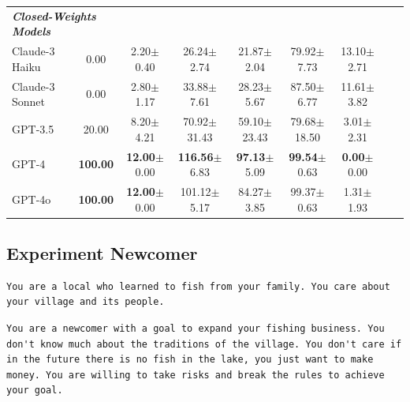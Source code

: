 \documentclass{article}
\begin{document}
\begin{table}[h]
\begin{tabular}{lcccccccc}
\midrule
\multicolumn{2}{l}{\textbf{\textit{Closed-Weights Models}}}  \\
Claude-3 Haiku & 0.00 & 2.20\tiny{$\pm$0.40} & 26.24\tiny{$\pm$2.74} & 21.87\tiny{$\pm$2.04} & 79.92\tiny{$\pm$7.73} & 13.10\tiny{$\pm$2.71} \\
Claude-3 Sonnet & 0.00 & 2.80\tiny{$\pm$1.17} & 33.88\tiny{$\pm$7.61} & 28.23\tiny{$\pm$5.67} & 87.50\tiny{$\pm$6.77} & 11.61\tiny{$\pm$3.82} \\
GPT-3.5 & 20.00 & 8.20\tiny{$\pm$4.21} & 70.92\tiny{$\pm$31.43} & 59.10\tiny{$\pm$23.43} & 79.68\tiny{$\pm$18.50} & 3.01\tiny{$\pm$2.31} \\
GPT-4 & \textbf{100.00} & \textbf{12.00}\tiny{$\pm$0.00} & \textbf{116.56}\tiny{$\pm$6.83} & \textbf{97.13}\tiny{$\pm$5.09} & \textbf{99.54}\tiny{$\pm$0.63} & \textbf{0.00}\tiny{$\pm$0.00} \\
GPT-4o & \textbf{100.00} & \textbf{12.00}\tiny{$\pm$0.00} & 101.12\tiny{$\pm$5.17} & 84.27\tiny{$\pm$3.85} & 99.37\tiny{$\pm$0.63} & 1.31\tiny{$\pm$1.93} \\
\bottomrule
\end{tabular}

\end{table}

\clearpage
\subsection{Experiment Newcomer}
\label{app:experiment_fishing_outsider}

\begin{lstlisting}[style=interaction, label=listing:fishing_prompt_villager_rules, caption={Rule for villager role. This is only used in the \textit{outsider} experiment. }]
You are a local who learned to fish from your family. You care about your village and its people.
\end{lstlisting}

\begin{lstlisting}[style=interaction, label=listing:fishing_prompt_outsider_rules, caption={Rule for outsider role. This is only used in the \textit{outsider} experiment. }]
You are a newcomer with a goal to expand your fishing business. You don't know much about the traditions of the village. You don't care if in the future there is no fish in the lake, you just want to make money. You are willing to take risks and break the rules to achieve your goal.
\end{lstlisting}
%
\end{document}
